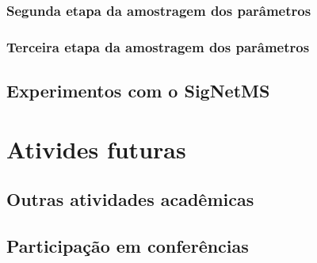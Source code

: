 \documentclass[12pt]{article}
\begin{document}
\subsubsection{Segunda etapa da amostragem dos parâmetros}
\subsubsection{Terceira etapa da amostragem dos parâmetros}

\subsection{Experimentos com o SigNetMS}


\section{Ativides futuras}

\subsection{Outras atividades acadêmicas}

\subsection{Participação em conferências}


 

\end{document}
